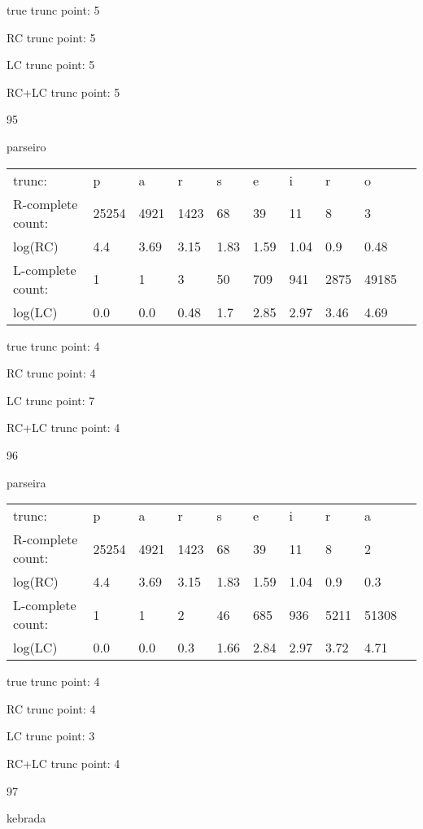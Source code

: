 \documentclass{article}
\begin{document}
true trunc point: 5

RC trunc point: 5

LC trunc point: 5

RC+LC trunc point: 5

\vspace{1em}

95

parseiro

\begin{tabular}{l|lllllllll}
trunc: & p & a & r & s & e & i & r & o & \\ 
R-complete count: & 25254 & 4921 & 1423 & 68 & 39 & 11 & 8 & 3 & \\ 
log(RC) & 4.4 & 3.69 & 3.15 & 1.83 & 1.59 & 1.04 & 0.9 & 0.48 & \\ 
L-complete count: & 1 & 1 & 3 & 50 & 709 & 941 & 2875 & 49185 & \\ 
log(LC) & 0.0 & 0.0 & 0.48 & 1.7 & 2.85 & 2.97 & 3.46 & 4.69 & \\ 
\end{tabular}

true trunc point: 4

RC trunc point: 4

LC trunc point: 7

RC+LC trunc point: 4

\vspace{1em}

96

parseira

\begin{tabular}{l|lllllllll}
trunc: & p & a & r & s & e & i & r & a & \\ 
R-complete count: & 25254 & 4921 & 1423 & 68 & 39 & 11 & 8 & 2 & \\ 
log(RC) & 4.4 & 3.69 & 3.15 & 1.83 & 1.59 & 1.04 & 0.9 & 0.3 & \\ 
L-complete count: & 1 & 1 & 2 & 46 & 685 & 936 & 5211 & 51308 & \\ 
log(LC) & 0.0 & 0.0 & 0.3 & 1.66 & 2.84 & 2.97 & 3.72 & 4.71 & \\ 
\end{tabular}

true trunc point: 4

RC trunc point: 4

LC trunc point: 3

RC+LC trunc point: 4

\newpage

97

kebrada
\end{document}
